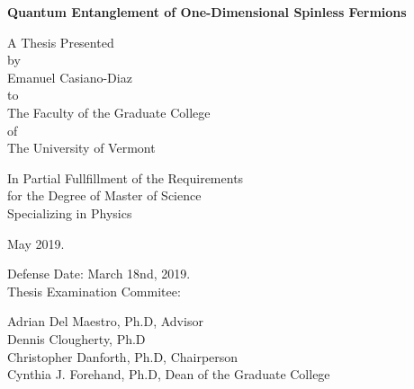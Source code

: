 \documentclass[12pt, two sided]{report}
\begin{document}
\begin{titlepage}
	\begin{center}
		\vspace{1cm}
				
		\Huge
		\textbf{Quantum Entanglement of One-Dimensional Spinless Fermions}
		
		\vspace{0.5cm}
		
		\vfill
		
		\normalsize
		A Thesis Presented \\
		\vspace{0.5cm}
		by \\
		\vspace{0.5cm}
		Emanuel Casiano-Diaz \\
		\vspace{0.5cm}
		to \\
		\vspace{0.5cm}
		The Faculty of the Graduate College \\
		\vspace{0.5cm}
		of \\
		\vspace{0.5cm}
		The University of Vermont
		
		\vspace{1.6cm}

	
		In Partial Fullfillment of the Requirements \\
		for the Degree of Master of Science \\
		Specializing in Physics	
			
		\vspace{0.75cm}
		
		May 2019.
		
	\end{center}
	
	\vspace{0.5cm}
	
	\begin{flushright}
		Defense Date: March 18nd, 2019. \\
		Thesis Examination Commitee:
		
		\vspace{0.5cm}
		
		Adrian Del Maestro, Ph.D, Advisor \\
		Dennis Clougherty, Ph.D \\
		Christopher Danforth, Ph.D, Chairperson \\
		Cynthia J. Forehand, Ph.D, Dean of the Graduate College
		
	
	\end{flushright}
\end{titlepage}
\end{document}
